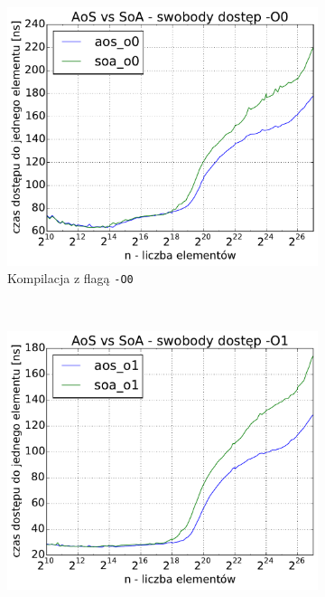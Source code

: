 \begin{figure}[!h]
    \centering
    \begin{subfigure}[c]{0.45\textwidth}
        \centering
        \includegraphics[width=\textwidth]{images/benchs_xeon/random_access_aos_vs_soa_O0}
        \caption{Kompilacja z flagą \texttt{-O0}}
    \end{subfigure}
    ~
    \begin{subfigure}[c]{0.45\textwidth}
        \centering
        \includegraphics[width=\textwidth]{images/benchs_xeon/random_access_aos_vs_soa_O1}

\end{subfigure}
\end{figure}
